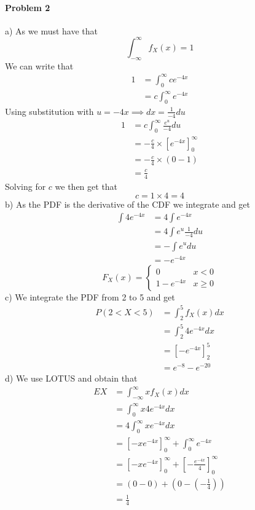 \paragraph{Problem 2}
a)
As we must have that
\[
    \int_{-\infty}^{\infty}f_{X}(x)=1
\]
We can write that
\begin{align*}
    1&=\int_{0}^{\infty}ce^{-4x} \\
     &=c\int_{0}^{\infty}e^{-4x}
\end{align*}
Using substitution with $u=-4x\implies dx=\frac{1}{-4}du$
\begin{align*}
    1&=c\int_{0}^{\infty}\frac{e^{u}}{-4}du \\
     &=-\frac{c}{4}\times\left[e^{-4x}\right]_{0}^{\infty} \\
     &=-\frac{c}{4}\times(0-1) \\
     &=\frac{c}{4}
\end{align*}
Solving for $c$ we then get that
\[
    c=1\times 4=4
\]
b)
As the PDF is the derivative of the CDF we integrate and get
\begin{align*}
    \int 4e^{-4x}&=4\int e^{-4x} \\
             &=4\int e^{u}\frac{1}{-4}du \\
             &=-\int e^{u}du \\
             &=-e^{-4x}
\end{align*}
\[
    F_{X}(x)=\begin{cases}0 & x<0 \\ 1-e^{-4x} & x\geq 0\end{cases}
\]
c)
We integrate the PDF from 2 to 5 and get
\begin{align*}
    P(2<X<5)&=\int_{2}^{5}f_{X}(x)dx \\
            &=\int_{2}^{5}4e^{-4x}dx \\
            &=\left[-e^{-4x}\right]_{2}^{5} \\
            &=e^{-8}-e^{-20}
\end{align*}
d)
We use LOTUS and obtain that
\begin{align*}
    EX&=\int_{-\infty}^{\infty}xf_{X}(x)dx \\
      &=\int_{0}^{\infty}x4e^{-4x}dx \\
      &=4\int_{0}^{\infty}xe^{-4x}dx \\
      &=\left[-xe^{-4x}\right]_{0}^{\infty}+\int_{0}^{\infty}e^{-4x} \\
      &=\left[-xe^{-4x}\right]_{0}^{\infty}+\left[-\frac{e^{-4x}}{4}\right]_{0}^{\infty} \\
      &=\left(0-0\right)+\left(0-\left(-\frac{1}{4}\right)\right) \\
      &=\frac{1}{4}
\end{align*}
